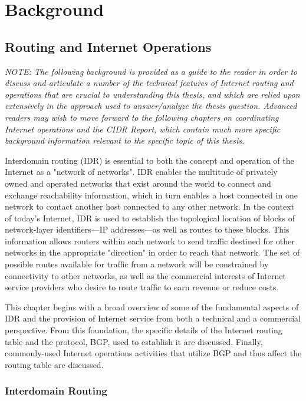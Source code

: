 \chapter{Background}
\label{chap:background}

\section{Routing and Internet Operations}

\emph{NOTE: The following background is provided as a guide to the reader in order to discuss and articulate a number of the technical features of Internet routing and operations that are crucial to understanding this thesis, and which are relied upon extensively in the approach used to answer/analyze the thesis question. Advanced readers may wish to move forward to the following chapters on coordinating Internet operations and the CIDR Report, which contain much more specific background information relevant to the specific topic of this thesis.}

Interdomain routing (IDR) is essential to both the concept and operation of the Internet as a "network of networks". IDR enables the multitude of privately owned and operated networks that exist around the world to connect and exchange reachability information, which in turn enables a host connected in one network to contact another host connected to any other network. In the context of today's Internet, IDR is used to establish the topological location of blocks of network-layer identifiers---IP addresses---as well as routes to these blocks. This information allows routers within each network to send traffic destined for other networks in the appropriate "direction" in order to reach that network. The set of possible routes available for traffic from a network will be constrained by connectivity to other networks, as well as the commercial interests of Internet service providers who desire to route traffic to earn revenue or reduce costs.

This chapter begins with a broad overview of some of the fundamental aspects of IDR and the provision of Internet service from both a technical and a commercial perspective. From this foundation, the specific details of the Internet routing table and the protocol, BGP, used to establish it are discussed. Finally, commonly-used Internet operations activities that utilize BGP and thus affect the routing table are discussed.

\subsection{Interdomain Routing}

